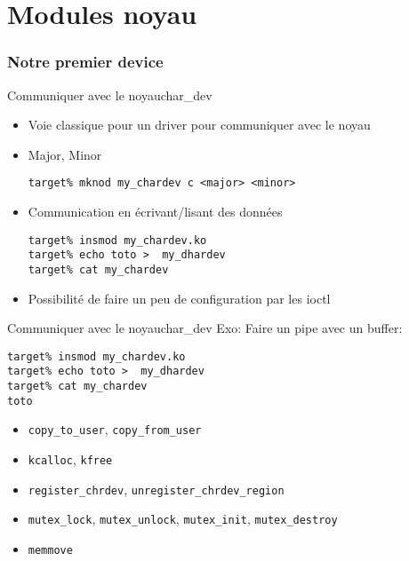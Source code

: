%
%

\part{Modules noyau}

\begin{frame}
  \partpage
\end{frame}

\begin{frame}
  \tableofcontents[currentpart]
\end{frame}



\section{Notre premier device}

\begin{frame}[fragile=singleslide]{Communiquer avec le noyau}{char\_dev}
  \begin{itemize}
  \item Voie classique pour un driver pour communiquer avec le noyau
  \item Major, Minor
    \begin{lstlisting}
target% mknod my_chardev c <major> <minor>
    \end{lstlisting}
  \item Communication en écrivant/lisant des données
    \begin{lstlisting}
target% insmod my_chardev.ko
target% echo toto >  my_dhardev
target% cat my_chardev
    \end{lstlisting}
  \item Possibilité de faire un peu de configuration par les ioctl
  \end{itemize}
\end{frame}

\begin{frame}[fragile=singleslide]{Communiquer avec le noyau}{char\_dev}
  Exo: Faire un pipe avec un buffer:
  \begin{lstlisting}
target% insmod my_chardev.ko
target% echo toto >  my_dhardev
target% cat my_chardev
toto
  \end{lstlisting}
  \begin{itemize}
  \item \verb+copy_to_user+, \verb+copy_from_user+
  \item \verb+kcalloc+, \verb+kfree+
  \item \verb+register_chrdev+, \verb+unregister_chrdev_region+
  \item   \verb+mutex_lock+,  \verb+mutex_unlock+,  \verb+mutex_init+,
    \verb+mutex_destroy+
  \item \verb+memmove+
  \end{itemize}
\end{frame}

